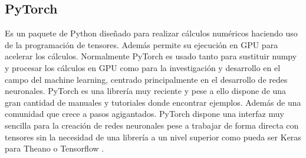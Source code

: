 \subsection*{PyTorch}
Es un paquete de Python diseñado para realizar cálculos numéricos haciendo uso de la programación de tensores. Además permite su ejecución en GPU para acelerar los cálculos. Normalmente PyTorch es usado tanto para sustituir numpy y procesar los cálculos en GPU como para la investigación y desarrollo en el campo del machine learning, centrado principalmente en el desarrollo de redes neuronales. PyTorch es una librería muy reciente y pese a ello dispone de una gran cantidad de manuales y tutoriales donde encontrar ejemplos. Además de una comunidad que crece a pasos agigantados. PyTorch dispone una interfaz muy sencilla para la creación de redes neuronales pese a trabajar de forma directa con tensores sin la necesidad de una librería a un nivel superior como pueda ser Keras para Theano o Tensorflow \cite{PyTorch}.